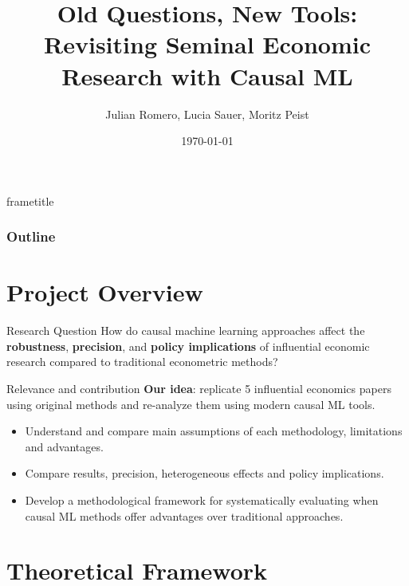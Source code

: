\documentclass{beamer}
\title{Old Questions, New Tools: Revisiting Seminal Economic Research with Causal ML}
\date{\centering\today}
\author{\centering Julian Romero, Lucia Sauer, Moritz Peist}
\institute{\centering}
\begin{document}
    \begin{frame}{}
        \titlepage
    \end{frame}
    {
        \nointerlineskip
        \begin{beamercolorbox}[sep=0.3cm,wd=\paperwidth]{frametitle}
            \strut\insertframetitle\strut
            \hfill
            \raisebox{-0.8mm}{}
        \end{beamercolorbox}
    }

    \begin{frame}
        \frametitle{Outline}
        \tableofcontents
    \end{frame}
    
    \section{Project Overview}
    
    \begin{frame}{Research Question}
        How do causal machine learning approaches affect the \textbf{robustness}, \textbf{precision}, and \textbf{policy implications} of influential economic research compared to traditional econometric methods? 
    \end{frame}
   
    \begin{frame}{Relevance and contribution}
    \textbf{Our idea}: replicate 5 influential economics papers using original methods and re-analyze them using modern causal ML tools.
        \begin{itemize}
            \item Understand and compare main assumptions of each methodology, limitations and advantages.
            \item Compare results, precision, heterogeneous effects and policy implications.
            \item Develop a methodological framework for systematically evaluating when causal ML methods offer advantages over traditional approaches.
        \end{itemize}

    \end{frame}
   
    \section{Theoretical Framework}
\end{document}

